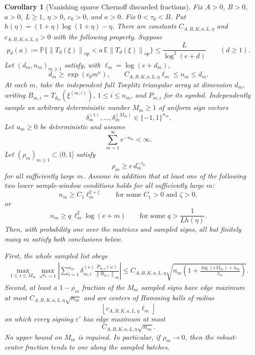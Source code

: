 \documentclass[11pt]{amsart}
\numberwithin{equation}{section}
\newtheorem{corollary}[theorem]{Corollary}
\theoremstyle{definition}
\theoremstyle{remark}
\newcommand{\op}{\mathrm{op}}
\newcommand{\Prob}{\mathbb P}
\newcommand{\Exp}{\mathbb E}
\newcommand{\norm}[1]{\left\lVert #1\right\rVert}
\newcommand{\eps}{\varepsilon}
\begin{document}
\begin{corollary}[Vanishing sparse Chernoff discarded fractions]
\label{cor:normalizer-tail-chernoff-borel-window-vanishing-fractions}
Fix \(A>0\), \(B>0\), \(a>0\), \(L\ge1\), \(\eta>0\), \(c_0>0\), and
\(\kappa>0\).  Fix \(0<\tau_0<B\).  Put \(h(\eta)=(1+\eta)\log(1+\eta)-\eta\).  There are constants
\(C_{A,B,K,a,L,\eta}\) and \(c_{A,B,K,a,L,\eta}>0\) with the following
property.  Suppose
\[
  p_d(a):=\Prob\{\norm{T_d(\xi)}_{\op}
      <a\,\Exp\norm{T_d(\xi)}_{\op}\}
  \le \frac{L}{\log^2(e+d)}
  \qquad(d\ge1).
\]
Let \((d_m,n_m)_{m\ge1}\) satisfy, with \(\ell_m=\log(e+d_m)\),
\[
  d_m\ge \exp(c_0m^\kappa),\qquad
  C_{A,B,K,a,L,\eta}\ell_m\le n_m\le d_m .
\]
At each \(m\), take the independent full Toeplitz triangular array at dimension
\(d_m\), writing \(B_{m,i}=T_{d_m}(\xi^{(m,i)})\), \(1\le i\le n_m\), and
\(P_{m,i}\) for its symbol.  Independently sample an arbitrary deterministic
number \(M_m\ge1\) of uniform sign vectors
\[
  \delta_m^{(1)},\ldots,\delta_m^{(M_m)}\in\{-1,1\}^{n_m}.
\]
Let \(u_m\ge0\) be deterministic and assume
\[
  \sum_{m=1}^{\infty}e^{-u_m}<\infty .
\]
Let \((\rho_m)_{m\ge1}\subset(0,1]\) satisfy
\[
  \rho_m\ge e\,d_m^{-\tau_0}
\]
for all sufficiently large \(m\).  Assume in addition that at least one of the
following two lower sample-window conditions holds for all sufficiently large
\(m\):
\[
  n_m\ge C_1\ell_m^{2+\zeta}
  \qquad\text{for some } C_1>0 \text{ and } \zeta>0,
\]
or
\[
  n_m\ge q\,\ell_m^2\log(e+m)
  \qquad\text{for some } q>\frac1{Lh(\eta)} .
\]
Then, with probability one over the matrices and sampled signs, all but
finitely many \(m\) satisfy both conclusions below.

First, the whole sampled list obeys
\[
\begin{aligned}
  \max_{1\le s\le M_m}\max_{\omega^{d_m}=1}
  \left|\sum_{i=1}^{n_m}\delta_{m,i}^{(s)}
  \frac{P_{m,i}(\omega)}{\norm{B_{m,i}}_{\op}}\right|
  \le
  C_{A,B,K,a,L,\eta}\sqrt{
    n_m\left(1+\frac{\log(eM_m)+u_m}{\ell_m}\right)} .
\end{aligned}
\]
Second, at least a \(1-\rho_m\) fraction of the \(M_m\) sampled signs have edge
maximum at most \(C_{A,B,K,a,L,\eta}\sqrt{n_m}\) and are centers of Hamming balls
of radius
\[
  \left\lfloor c_{A,B,K,a,L,\eta}\ell_m\right\rfloor
\]
on which every signing \(\eps'\) has edge maximum at most
\[
  C_{A,B,K,a,L,\eta}\sqrt{n_m}.
\]
No upper bound on \(M_m\) is required.  In particular, if \(\rho_m\to0\), then
the robust-center fraction tends to one along the sampled batches.
\end{corollary}
\end{document}
